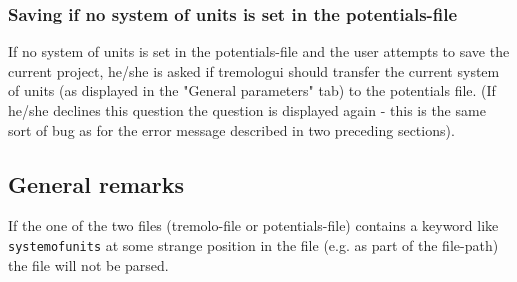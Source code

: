 \documentclass[11pt]{article}
\begin{document}
\subsubsection{Saving if no system of units is set in the potentials-file}
\label{sec-1-3-3}
If no system of units is set in the potentials-file and the user attempts to
save the current project, he/she is asked if tremologui should transfer the
current system of units (as displayed in the "General parameters" tab) to the
potentials file. (If he/she declines this question the question is displayed
again - this is the same sort of bug as for the error message described in
two preceding sections).
\subsection{General remarks}
\label{sec-1-4}
If the one of the two files (tremolo-file or potentials-file) contains a keyword
like \texttt{systemofunits} at some strange position in the file (e.g. as part of the
file-path) the file will not be parsed.
\end{document}
